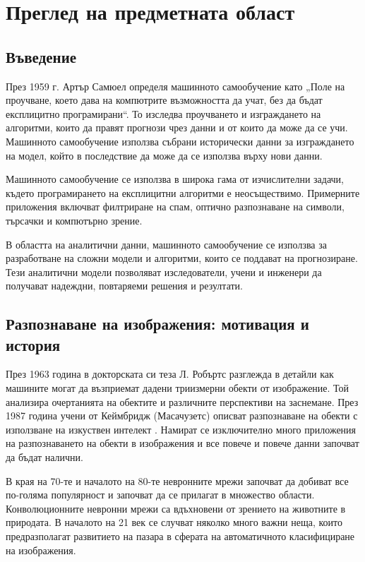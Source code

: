 \chapter{Преглед на предметната област} %

\label{Chapter2} 


\section{Въведение}

През 1959 г. Артър Самюел определя машинното самообучение като „Поле на проучване, което дава на компютрите възможността да учат, без да бъдат експлицитно програмирани“. То изследва проучването и изграждането на алгоритми, които да правят прогнози чрез данни и от които да може да се учи. Машинното самообучение използва събрани исторически данни  за изграждането на модел, който в последствие да може да се използва върху нови данни.

Машинното самообучение се използва в широка гама от изчислителни задачи, където програмирането на експлицитни алгоритми е неосъществимо. Примерните приложения включват филтриране на спам, оптично разпознаване на символи, търсачки и компютърно зрение.

В областта на аналитични данни, машинното самообучение се използва за разработване на сложни модели и алгоритми, които се поддават на прогнозиране. Тези аналитични модели позволяват изследователи, учени и инженери да получават надеждни, повтаряеми решения и резултати.

\section{Разпознаване на изображения: мотивация и история}

През 1963 година в докторската си теза Л. Робъртс \cite{Solids1963} разглежда в детайли как машините могат да възприемат дадени триизмерни обекти от изображение. Той анализира очертанията на обектите и различните перспективи на заснемане. През 1987 година учени от Кеймбридж (Масачузетс) описват разпознаване на обекти с използване на изкуствен интелект \cite{Alignment1987}. Намират се изключително много приложения на разпознаването на обекти в изображения и все повече и повече данни започват да бъдат налични.

В края на 70-те и началото на 80-те невронните мрежи започват да добиват все по-голяма популярност и започват да се прилагат в множество области. Конволюционните невронни мрежи са вдъхновени от зрението на животните в природата. В началото на 21 век се случват няколко много важни неща, които предразполагат развитието на пазара в сферата на автоматичното класифициране на изображения.

